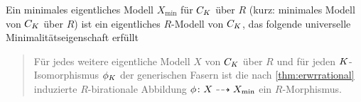 \begin{Definition}
  Ein minimales eigentliches Modell $X_{\text{min}}$ für $C_{K}$ über
  $R$ (kurz: minimales Modell von $C_{K}$ über $R$) ist ein
  eigentliches $R$-Modell von $C_{K}$, das folgende universelle
  Minimalitätseigenschaft erfüllt
  \begin{quote}
    Für jedes weitere eigentliche Modell $X$ von
    $C_{K}$ über $R$ und für jeden $K$-Isomorphismus $\phi_{K}$ der
    generischen Fasern ist die nach \ref{thm:erwrrational}
    induzierte $R$-birationale Abbildung $\phi\colon X\dashrightarrow
    X_{\text{min}}$ ein $R$-Morphismus.
  \end{quote}
\end{Definition}

